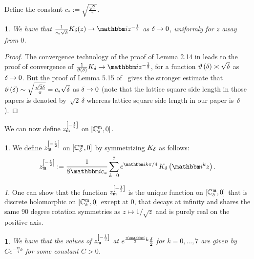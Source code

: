 \documentclass[12pt,oneside,english]{amsart}
\numberwithin{equation}{section}
\numberwithin{figure}{section}
\theoremstyle{plain}
\theoremstyle{plain}
\theoremstyle{plain}
\theoremstyle{plain}
\newtheorem{lem}[thm]{\protect\lemmaname}
\theoremstyle{remark}
\newtheorem{rem}[thm]{\protect\remarkname}
\theoremstyle{definition}
\newtheorem{defn}[thm]{\protect\definitionname}
\theoremstyle{plain}
\theoremstyle{plain}
\numberwithin{thm}{section}
\providecommand{\definitionname}{Definition}
\providecommand{\lemmaname}{Lemma}
\providecommand{\remarkname}{Remark}
\providecommand{\definitionname}{Definition}
\providecommand{\lemmaname}{Lemma}
\providecommand{\remarkname}{Remark}
\providecommand{\definitionname}{Definition}
\providecommand{\lemmaname}{Lemma}
\providecommand{\remarkname}{Remark}
\providecommand{\definitionname}{Definition}
\providecommand{\lemmaname}{Lemma}
\providecommand{\remarkname}{Remark}
\begin{document}
Define the constant $c_{*} := \sqrt{\frac{\sqrt{2}}{\pi}}$.
\begin{lem}
\label{lem:convergence-k-function}We have that 
$\frac{1}{c_{*}\sqrt{\meshsz}}K_{\meshsz}(z) \to \ii z^{-\frac{1}{2}}$
as ${\delta} \to 0$, uniformly for $z$ away from $0$. 
\end{lem}
\begin{proof}
The convergence technology of the proof of Lemma 2.14 in 
\cite{chelkak-hongler-izyurov}
leads to the proof of convergence of 
$\frac{1}{\vartheta\left(\meshsz\right)}K_{\meshsz} \to \ii z^{-\frac{1}{2}}$,
for a function $\vartheta\left({\delta}\right)\asymp\sqrt{{\delta}}$
as ${\delta} \to 0$. But the proof of Lemma 5.15 of~\cite{gheissari-hongler-park}
gives the stronger estimate that 
$\vartheta\left({\delta}\right)\sim\sqrt{\frac{\sqrt{2}{\delta}}{\pi}}
= c_{*} \sqrt{{\delta}}$
as ${\delta} \to 0$ 
(note that the lattice square side length in those papers is denoted 
by~$\sqrt{2}\,\delta$ whereas lattice square side length in our paper 
is~${\delta}$). 
\end{proof}
We can now define $z_{\mathfrak{m}}^{\left[-\frac{1}{2}\right]}$ on 
${\left[ {\mathbb{C}_{{\delta}}^{\mathfrak{m}}}, 0 \right]}$.
\begin{defn}
\label{def:discrete-inverse-square-root}We define 
$z_{\mathfrak{m}}^{\left[-\frac{1}{2}\right]}$
on ${\left[  {\mathbb{C}_{{\delta}}^{\mathfrak{m}}} , 0  \right]}$ by symmetrizing $K_{{\delta}}$
as follows: 
\[
z_{\mdl}^{\left[-\frac{1}{2}\right]} 
:= \frac{1}{8 \ii c_{*}} \sum_{k=0}^{7}
    e^{\ii k \pi / 4 } \, K_{\meshsz}\left(\ii^{k}z\right).
\]
\end{defn}

\begin{rem}
One can show that the function $z_{\mathfrak{m}}^{\left[-\frac{1}{2}\right]}$
is the unique function on ${\left[ {\mathbb{C}_{{\delta}}^{\mathfrak{m}}}, 0 \right]}$
that is discrete holomorphic on ${\left[ {\mathbb{C}_{{\delta}}^{\mathfrak{m}}}, 0 \right]}$
except at $0$, that decays at infinity and shares the same 90 degree
rotation symmetries as $z\mapsto1/\sqrt{z}$ and is purely real on
the positive axis. %
\end{rem}

\begin{lem}
We have that the values of $z_{\mathfrak{m}}^{\left[-\frac{1}{2}\right]}$ at
$e^{\frac{\pi \ii }{2}k}\frac{\meshsz}{2}$ for $k=0,\ldots,7$ are given
by $Ce^{-\frac{\pi \ii }{4}k}$ for some constant $C>0$. 
\end{lem}
\end{document}
